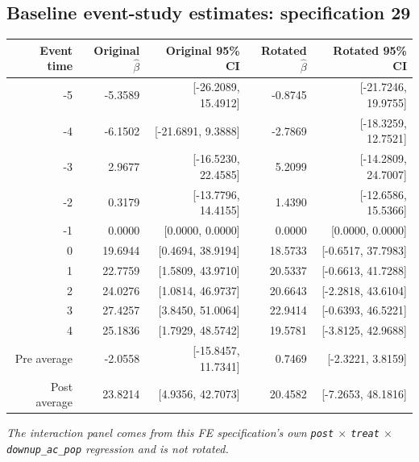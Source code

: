 \documentclass[10pt]{article}
\begin{document}
\subsection*{Baseline event-study estimates: specification 29}
\begin{center}
\scriptsize
\begin{tabular}{r rr rr}
\toprule
Event time & Original $\hat\beta$ & Original 95\% CI & Rotated $\hat\beta$ & Rotated 95\% CI \\
\midrule
-5 & -5.3589 & [-26.2089, 15.4912] & -0.8745 & [-21.7246, 19.9755] \\
-4 & -6.1502 & [-21.6891, 9.3888] & -2.7869 & [-18.3259, 12.7521] \\
-3 & 2.9677 & [-16.5230, 22.4585] & 5.2099 & [-14.2809, 24.7007] \\
-2 & 0.3179 & [-13.7796, 14.4155] & 1.4390 & [-12.6586, 15.5366] \\
-1 & 0.0000 & [0.0000, 0.0000] & 0.0000 & [0.0000, 0.0000] \\
0 & 19.6944 & [0.4694, 38.9194] & 18.5733 & [-0.6517, 37.7983] \\
1 & 22.7759 & [1.5809, 43.9710] & 20.5337 & [-0.6613, 41.7288] \\
2 & 24.0276 & [1.0814, 46.9737] & 20.6643 & [-2.2818, 43.6104] \\
3 & 27.4257 & [3.8450, 51.0064] & 22.9414 & [-0.6393, 46.5221] \\
4 & 25.1836 & [1.7929, 48.5742] & 19.5781 & [-3.8125, 42.9688] \\
\midrule
Pre average & -2.0558 & [-15.8457, 11.7341] & 0.7469 & [-2.3221, 3.8159] \\
Post average & 23.8214 & [4.9356, 42.7073] & 20.4582 & [-7.2653, 48.1816] \\
\bottomrule
\end{tabular}
\end{center}
\medskip
\textit{The interaction panel comes from this FE specification's own \texttt{post} $\times$ \texttt{treat} $\times$ \texttt{downup\_ac\_pop} regression and is not rotated.}
\clearpage
\end{document}
